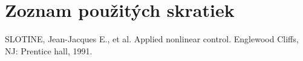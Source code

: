 \documentclass[a4paper,slovak,12pt,appendix,twoside,openright,table]{article}
\begin{document}




%

%

\newpage
\tableofcontents{}
\setcounter{secnumdepth}{0}
\newpage
\section{Zoznam použitých skratiek}

 
\setcounter{secnumdepth}{1}



{
	\sectionfont{\sectionrule{0pt}{0pt}{-2ex}{0.5pt}}
}
{
	\sectionfont{\sectionrule{0pt}{0pt}{-2ex}{0pt}}
}




%

%



\newpage
{}
%


\begin{thebibliography}{9}
 SLOTINE, Jean-Jacques E., et al. Applied nonlinear control. Englewood Cliffs, NJ: Prentice hall, 1991.
\end{thebibliography}
\appendix

\end{document}
